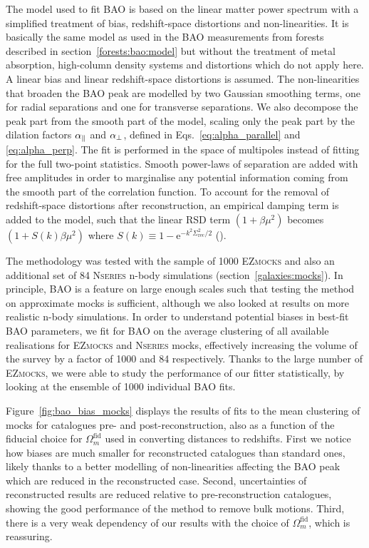 The model used to fit BAO is based on the linear matter power spectrum with a simplified
treatment of bias, redshift-space distortions and non-linearities. 
It is basically the same model as used in the BAO measurements from 
\lya forests described in section~\ref{forests:bao:model} but without 
the treatment of metal absorption, high-column density systems and 
distortions which do not apply here. 
A linear bias and linear redshift-space distortions is assumed. 
The non-linearities that broaden the BAO peak are modelled by two 
Gaussian smoothing terms, one for radial separations and one for transverse separations. 
We also decompose the peak part from the smooth part of the model, 
scaling only the peak part by the dilation factors ${\alpha_\parallel}$ and ${\alpha_\perp}$, 
defined in Eqs.~\ref{eq:alpha_parallel} and \ref{eq:alpha_perp}.
The fit is performed in the space of multipoles instead of fitting for the 
full two-point statistics. Smooth power-laws of separation are added with free amplitudes 
in order to marginalise any potential information coming from 
the smooth part of the correlation function. 
To account for the removal of redshift-space distortions after reconstruction, 
an empirical damping term is added to the model, such that the linear RSD term 
$(1+\beta \mu^2)$ becomes $(1+ S(k) \beta \mu^2)$ where 
$S(k)\equiv 1- \text{e}^{-k^2\Sigma^2_\text{rec}/2}$ 
(\cite{seoModelingReconstructedBAO2016}). 

The methodology was tested with the sample of 1000 \textsc{EZmocks} 
and also an additional set of 84 \textsc{Nseries} n-body simulations 
(section~\ref{galaxies:mocks}). 
In principle, BAO is a feature on large enough scales 
such that testing the method on approximate mocks is sufficient, 
although we also looked at results on more realistic n-body simulations. 
In order to understand potential biases in best-fit BAO parameters, 
we fit for BAO on the average clustering of all available realisations 
for \textsc{EZmocks} and \textsc{Nseries} mocks,
effectively increasing the volume of the survey by a factor of 1000 and 84
respectively. Thanks to the large number of \textsc{EZmocks}, we 
were able to study the performance of our fitter statistically, 
by looking at the ensemble of 1000 individual BAO fits. 

Figure~\ref{fig:bao_bias_mocks} displays the results of fits 
to the mean clustering of mocks for 
catalogues pre- and post-reconstruction, also as a function of the 
fiducial choice for $\Omega_m^\text{fid}$ used in converting distances to redshifts. 
First we notice how biases are much smaller for reconstructed catalogues 
than standard ones, likely thanks to a better modelling of non-linearities 
affecting the BAO peak which are reduced in the reconstructed case. 
Second, uncertainties of reconstructed results 
are reduced relative to pre-reconstruction catalogues, 
showing the good performance of the method to remove 
bulk motions. 
Third, there is a very weak dependency of our results with the choice of
$\Omega_m^\text{fid}$, which is reassuring. 

